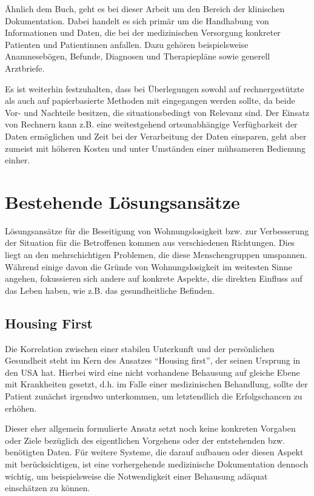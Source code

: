 Ähnlich dem Buch, geht es bei dieser Arbeit um den Bereich der klinischen Dokumentation. Dabei handelt es sich primär um die Handhabung von Informationen und Daten, die bei der medizinischen Versorgung konkreter Patienten und Patientinnen anfallen. Dazu gehören beispielsweise Anamnesebögen, Befunde, Diagnosen und Therapiepläne sowie generell Arztbriefe.

Es ist weiterhin festzuhalten, dass bei Überlegungen sowohl auf rechnergestützte als auch auf papierbasierte Methoden mit eingegangen werden sollte, da beide Vor- und Nachteile besitzen, die situationsbedingt von Relevanz sind. Der Einsatz von Rechnern kann z.B. eine weitestgehend ortsunabhängige Verfügbarkeit der Daten ermöglichen und Zeit bei der Verarbeitung der Daten einsparen, geht aber zumeist mit höheren Kosten und unter Umständen einer mühsameren Bedienung einher.


\section{Bestehende Lösungsansätze}\label{sec:approaches}

Lösungsansätze für die Beseitigung von Wohnungslosigkeit bzw. zur Verbesserung der Situation für die Betroffenen kommen aus verschiedenen Richtungen. Dies liegt an den mehrschichtigen Problemen, die diese Menschengruppen umspannen. Während einige davon die Gründe von Wohnungslosigkeit im weitesten Sinne angehen, fokussieren sich andere auf konkrete Aspekte, die direkten Einfluss auf das Leben haben, wie z.B. das gesundheitliche Befinden.

\subsection{Housing First}

Die Korrelation zwischen einer stabilen Unterkunft und der persönlichen Gesundheit steht im Kern des Ansatzes \enquote{Housing first}, der seinen Ursprung in den USA hat. Hierbei wird eine nicht vorhandene Behausung auf gleiche Ebene mit Krankheiten gesetzt, d.h. im Falle einer medizinischen Behandlung, sollte der Patient zunächst irgendwo unterkommen, um letztendlich die Erfolgschancen zu erhöhen. 

Dieser eher allgemein formulierte Ansatz setzt noch keine konkreten Vorgaben oder Ziele bezüglich des eigentlichen Vorgehens oder der entstehenden bzw. benötigten Daten. Für weitere Systeme, die darauf aufbauen oder diesen Aspekt mit berücksichtigen, ist eine vorhergehende medizinische Dokumentation dennoch wichtig, um beispielsweise die Notwendigkeit einer Behausung adäquat einschätzen zu können. \citep{Srebnik.2013}

